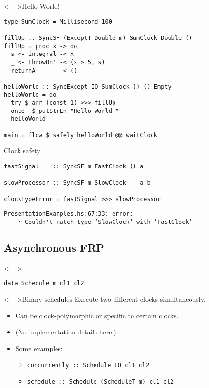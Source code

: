 \documentclass[handout]{enigtex-beamer-base}
\begin{document}
\begin{frame}[fragile]
\begin{block}<+->{Hello World!}
\begin{verbatim}
type SumClock = Millisecond 100

fillUp :: SyncSF (ExceptT Double m) SumClock Double ()
fillUp = proc x -> do
  s <- integral -< x
  _ <- throwOn' -< (s > 5, s)
  returnA       -< ()

helloWorld :: SyncExcept IO SumClock () () Empty
helloWorld = do
  try $ arr (const 1) >>> fillUp
  once_ $ putStrLn "Hello World!"
  helloWorld

main = flow $ safely helloWorld @@ waitClock
\end{verbatim}
\end{block}
\end{frame}

\begin{frame}[fragile]
\begin{block}{Clock safety}
\begin{verbatim}
fastSignal    :: SyncSF m FastClock () a

slowProcessor :: SyncSF m SlowClock    a b

clockTypeError = fastSignal >>> slowProcessor
\end{verbatim}
\begin{verbatim}
PresentationExamples.hs:67:33: error:
    • Couldn't match type ‘SlowClock’ with ‘FastClock’
\end{verbatim}
\end{block}
\end{frame}

\subsection{Asynchronous FRP}

\begin{frame}[fragile]
\begin{block}<+->{}
\begin{verbatim}
data Schedule m cl1 cl2
\end{verbatim}
\end{block}
	\begin{block}<+->{Binary schedules}
		Execute two different clocks simultaneously.
	\end{block}
	\begin{itemize}[<+->]
		\item Can be clock-polymorphic or specific to certain clocks.
		\item (No implementation details here.)
		\item Some examples:
		\begin{itemize}[<+->]
			\item \texttt{concurrently :: Schedule IO cl1 cl2}
			\item \texttt{schedule :: Schedule (ScheduleT m) cl1 cl2}
		\end{itemize}
	\end{itemize}
\end{frame}
\end{document}
